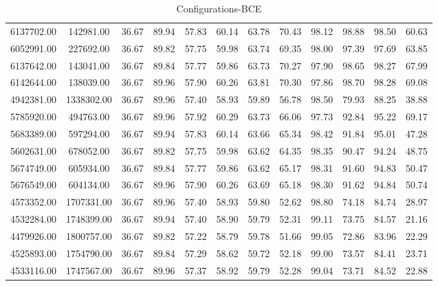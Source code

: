 \begin{table}
\caption{Configurations-BCE}
\begin{tabular}{cccccccccccc}
6137702.00& 142981.00& 36.67& 89.94& 57.83& 60.14& 63.78& 70.43& 98.12& 98.88& 98.50& 60.63\tabularnewline
6052991.00& 227692.00& 36.67& 89.82& 57.75& 59.98& 63.74& 69.35& 98.00& 97.39& 97.69& 63.85\tabularnewline
6137642.00& 143041.00& 36.67& 89.84& 57.77& 59.86& 63.73& 70.27& 97.90& 98.65& 98.27& 67.99\tabularnewline
6142644.00& 138039.00& 36.67& 89.96& 57.90& 60.26& 63.81& 70.30& 97.86& 98.70& 98.28& 69.08\tabularnewline
4942381.00& 1338302.00& 36.67& 89.96& 57.40& 58.93& 59.89& 56.78& 98.50& 79.93& 88.25& 38.88\tabularnewline
5785920.00& 494763.00& 36.67& 89.96& 57.92& 60.29& 63.73& 66.06& 97.73& 92.84& 95.22& 69.17\tabularnewline
5683389.00& 597294.00& 36.67& 89.94& 57.83& 60.14& 63.66& 65.34& 98.42& 91.84& 95.01& 47.28\tabularnewline
5602631.00& 678052.00& 36.67& 89.82& 57.75& 59.98& 63.62& 64.35& 98.35& 90.47& 94.24& 48.75\tabularnewline
5674749.00& 605934.00& 36.67& 89.84& 57.77& 59.86& 63.62& 65.17& 98.31& 91.60& 94.83& 50.47\tabularnewline
5676549.00& 604134.00& 36.67& 89.96& 57.90& 60.26& 63.69& 65.18& 98.30& 91.62& 94.84& 50.74\tabularnewline
4573352.00& 1707331.00& 36.67& 89.96& 57.40& 58.93& 59.80& 52.62& 98.80& 74.18& 84.74& 28.97\tabularnewline
4532284.00& 1748399.00& 36.67& 89.94& 57.40& 58.90& 59.79& 52.31& 99.11& 73.75& 84.57& 21.16\tabularnewline
4479926.00& 1800757.00& 36.67& 89.82& 57.22& 58.79& 59.78& 51.66& 99.05& 72.86& 83.96& 22.29\tabularnewline
4525893.00& 1754790.00& 36.67& 89.84& 57.29& 58.62& 59.72& 52.18& 99.00& 73.57& 84.41& 23.71\tabularnewline
4533116.00& 1747567.00& 36.67& 89.96& 57.37& 58.92& 59.79& 52.28& 99.04& 73.71& 84.52& 22.88\tabularnewline
\end{tabular}
\end{table}
